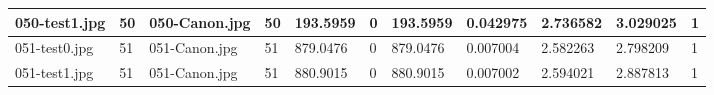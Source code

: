 \begin{landscape}
\begin{longtable}{|p{2cm}|p{1cm}|p{2cm}|p{1cm}|p{2cm}|p{1cm}|p{2cm}|p{2cm}|p{2cm}|p{2cm}|p{1cm}|}
		050-test1.jpg   & 50               & 050-Canon.jpg         & 50                          & 193.5959              & 0                       & 193.5959                   & 0.042975              & 2.736582              & 3.029025                 & 1                \\ \hline
		051-test0.jpg   & 51               & 051-Canon.jpg         & 51                          & 879.0476              & 0                       & 879.0476                   & 0.007004              & 2.582263              & 2.798209                 & 1                \\ \hline
		051-test1.jpg   & 51               & 051-Canon.jpg         & 51                          & 880.9015              & 0                       & 880.9015                   & 0.007002              & 2.594021              & 2.887813                 & 1                \\ \hline
	\end{longtable}
\end{landscape}

